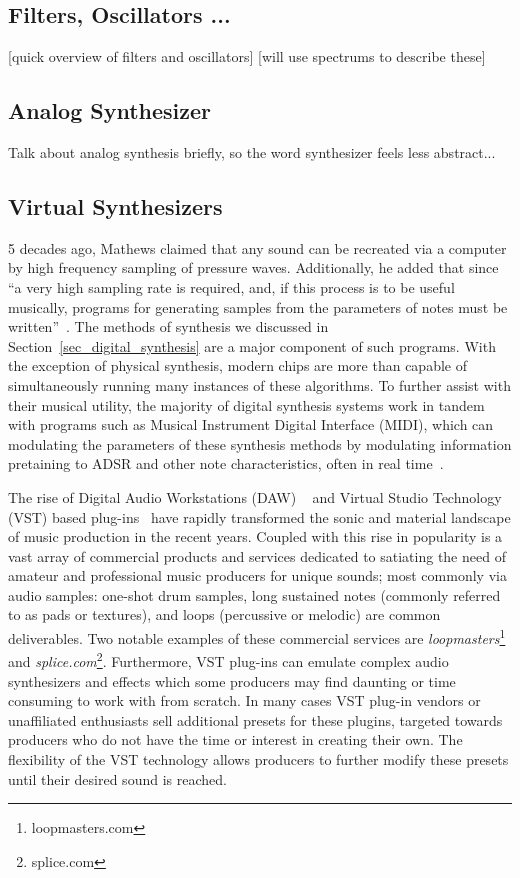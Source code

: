 \documentclass[\main/thesis.tex]{subfiles}
\begin{document}
\subsection{Filters, Oscillators ...}
[quick overview of filters and oscillators]
[will use spectrums to describe these]

\subsection{Analog Synthesizer}
Talk about analog synthesis briefly, so the word synthesizer feels less abstract...
\subsection{Virtual Synthesizers}
5 decades ago, Mathews claimed that any sound can be recreated via a computer by high frequency sampling of pressure waves. Additionally, he added that since \enquote{a very high sampling rate is required, and, if this process is to be useful musically, programs for generating samples from the parameters of notes must be written}~\cite{mathews1963digital}. The methods of synthesis we discussed in Section~\ref{sec_digital_synthesis} are a major component of such programs. With the exception of physical synthesis, modern chips are more than capable of simultaneously running many instances of these algorithms. To further assist with their musical utility, the majority of digital synthesis systems work in tandem with programs such as Musical Instrument Digital Interface (MIDI), which can  modulating the parameters of these synthesis methods by modulating information pretaining to ADSR and other note characteristics, often in real time~\cite{moog1986midi}.  


 The rise of Digital Audio Workstations (DAW) ~\cite{leider2004digital} and Virtual Studio Technology (VST) based plug-ins~\cite{tanev2013virtual} have rapidly transformed the sonic and material landscape of music production in the recent years. Coupled with this rise in popularity is a vast array of commercial products and services dedicated to satiating the need of amateur and professional music producers for unique sounds; most commonly via audio samples: one-shot drum samples, long sustained notes (commonly referred to as pads or textures), and loops (percussive or melodic) are common deliverables. Two notable examples of these commercial services are \textit{loopmasters}\footnote{loopmasters.com} and \textit{splice.com}\footnote{splice.com}. Furthermore, VST plug-ins can emulate complex audio synthesizers and effects which some producers may find daunting or time consuming to work with from scratch. In many cases VST plug-in vendors or unaffiliated enthusiasts sell additional presets for these plugins, targeted towards producers who do not have the time or interest in creating their own. The flexibility of the VST technology allows producers to further modify these presets until their desired sound is reached.
\end{document}
